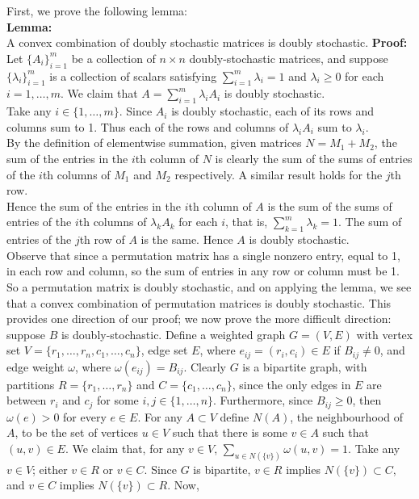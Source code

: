 \documentclass[12pt]{article}
\begin{document}
First, we prove the following lemma:\\
{\bf Lemma:}\\
A convex combination of doubly stochastic matrices is doubly stochastic.
%
{\bf Proof:}\\
Let $\{A_i\}_{i=1}^m$ be a collection of $n \times n$ doubly-stochastic matrices, and suppose $\{\lambda_i\}_{i=1}^m$ is a collection of scalars satisfying
$\sum_{i=1}^m \lambda_i=1$ and $\lambda_i \geq 0$ for each $i=1,\ldots,m$.
We claim that $A=\sum_{i=1}^m \lambda_iA_i$ is doubly stochastic.\\
Take any $i \in \{1,\ldots,m\}$.  Since $A_i$ is doubly stochastic, each of its rows and columns sum to 1.  Thus each of the rows and columns of $\lambda_iA_i$ sum to $\lambda_i$.\\
By the definition of elementwise summation, given matrices $N=M_1+M_2$, the sum of the entries in the $i$th column of $N$ is clearly the sum of the sums of entries of the $i$th columns of $M_1$ and $M_2$ respectively.  A similar result holds for the $j$th row.\\
Hence the sum of the entries in the $i$th column of $A$ is the sum of the sums of entries of the $i$th columns of $\lambda_kA_k$ for each $i$, that is, $\sum_{k=1}^m \lambda_k=1$.  The sum of entries of the $j$th row of $A$ is the same.  Hence $A$ is doubly stochastic.\\
%
Observe that since a permutation matrix has a single nonzero entry, equal to 1, in each row and column, so the sum of entries in any row or column must be 1.  So a permutation matrix is doubly stochastic, and on applying the lemma, we see that a convex combination of permutation matrices is doubly stochastic.
%
This provides one direction of our proof; we now prove the more difficult direction: suppose $B$ is doubly-stochastic.  Define a weighted graph $G=(V,E)$ with vertex set $V=\{r_1,\ldots,r_n,c_1,\ldots,c_n\}$, edge set $E$, where $e_{ij}=(r_i,c_i) \in E$ if $B_{ij} \neq 0$, and edge weight $\omega$, where $\omega(e_{ij})=B_{ij}$.
%
Clearly $G$ is a bipartite graph, with partitions $R=\{r_1,\ldots,r_n\}$ and $C=\{c_1,\ldots,c_n\}$, since the only edges in $E$ are between $r_i$ and $c_j$ for some $i,j \in \{1,\ldots,n\}$.  Furthermore, since $B_{ij} \geq 0$, then $\omega(e)>0$ for every $e \in E$.
%
For any $A \subset V$ define $N(A)$, the neighbourhood of $A$, to be the set of vertices $u \in V$ such that there is some $v \in A$ such that $(u,v) \in E$.
%
We claim that, for any $v \in V$, $\sum_{u \in N(\{v\})} \omega(u,v)=1$.  Take any $v \in V$; either $v \in R$ or $v \in C$.  Since $G$ is bipartite, $v \in R$ implies $N(\{v\}) \subset C$, and $v \in C$ implies $N(\{v\}) \subset R$.  Now,
\end{document}
